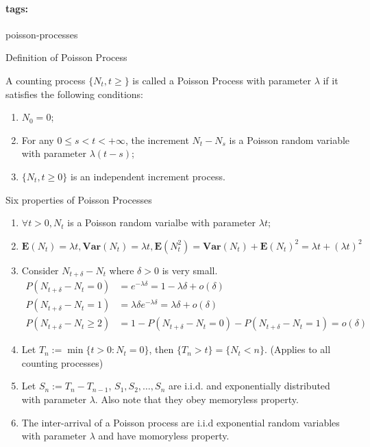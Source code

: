 \documentclass[11pt]{article}
\newcommand{\expect}[1]{\mathbf{E}(#1)}
\newcommand{\var}[1]{\mathbf{Var}(#1)}
\newcommand*{\tags}[1]{\paragraph{tags: }#1\bigskip}
\newcommand*{\xfield}[1]{\begin{mdframed}\centering #1\end{mdframed}\bigskip}
\newenvironment{field}{}{}
\newenvironment{note}{}{}
\begin{document}
%
\tags{poisson-processes}
\begin{note}
  \xfield{Definition of Poisson Process}
  \begin{field}
     A counting process \(\{N_t, t \geq \}\) is called a Poisson
     Process with parameter \(\lambda\) if it satisfies the following
     conditions:
     \begin{enumerate}
     \item \(N_0 = 0\);
     \item For any \(0 \leq s < t < +\infty\), the increment \(N_t -
       N_s\) is a Poisson random variable with parameter
       \(\lambda(t-s)\);
     \item \(\{N_t, t \geq 0\}\) is an independent increment process.
     \end{enumerate}
  \end{field}
\end{note}
%
\begin{note}
  \xfield{Six properties of Poisson Processes}
  \begin{field}
  \begin{enumerate}
  \item \(\forall t > 0, N_t\) is a Poisson random varialbe with
    parameter \(\lambda t\);
  \item \(\expect{N_t} = \lambda t, \var{N_t} = \lambda t,
    \expect{N^2_t} = \var{N_t} + \expect{N_t}^2 = \lambda t + (\lambda
    t)^2\)
  \item Consider \(N_{t + \delta} - N_t\) where \(\delta > 0\) is very
    small.
    \begin{align*}
      P(N_{t + \delta} - N_t = 0)
      & = e^{-\lambda \delta} = 1 - \lambda \delta + o(\delta) \\
      P(N_{t + \delta} - N_t = 1)
      & = \lambda \delta e^{-\lambda \delta} = \lambda \delta +
        o(\delta) \\
      P(N_{t + \delta} - N_t \geq 2)
      & = 1 - P(N_{t + \delta} - N_t = 0) - P(N_{t + \delta} - N_t =
        1) = o(\delta)
    \end{align*}
  \item Let \(T_n := \min \{ t > 0: N_t = 0\}\), then \(\{T_n > t\} =
    \{N_t < n\}\). (Applies to all counting processes)
  \item Let \(S_n := T_n - T_{n-1}\), \(S_1, S_2, \ldots, S_n\) are
    i.i.d. and exponentially distributed with parameter
    \(\lambda\). Also note that they obey memoryless property.
  \item The inter-arrival of a Poisson process are i.i.d exponential
    random variables with parameter \(\lambda\) and have momoryless
    property.
  \end{enumerate}
  \end{field}
\end{note}
\end{document}

